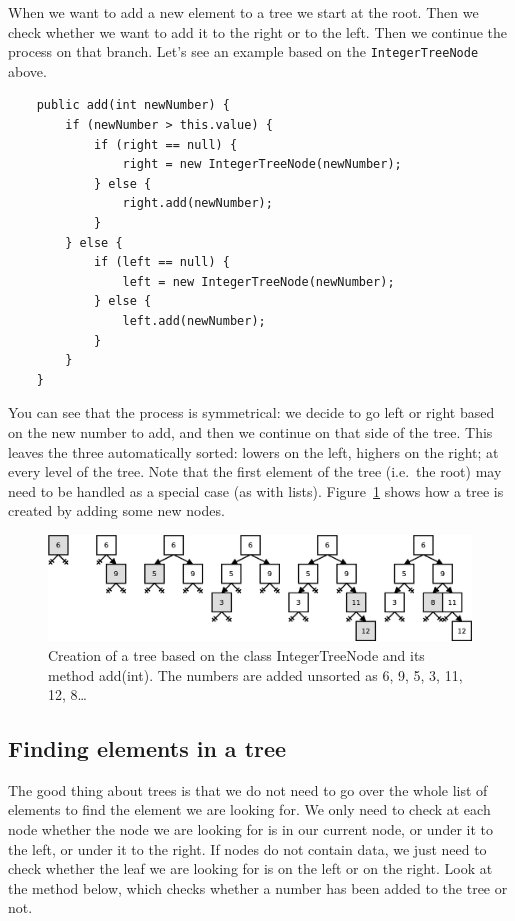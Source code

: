 When we want to add a new element to a tree we start at the root. Then
we check whether we want to add it to the right or to the left. Then
we continue the process on that branch. Let's see an example based on 
the \verb+IntegerTreeNode+ above.

\begin{verbatim}
    public add(int newNumber) {
        if (newNumber > this.value) {
            if (right == null) {
                right = new IntegerTreeNode(newNumber);
            } else {
                right.add(newNumber);
            }
        } else {
            if (left == null) {
                left = new IntegerTreeNode(newNumber);
            } else {
                left.add(newNumber);
            }
        }            
    }
\end{verbatim}

You can see that the process is symmetrical: we decide to go left or
right based on the new number to add, and then we continue on that
side of the tree. This leaves the three automatically sorted: lowers
on the left, highers on the right; at every level of the tree. 
Note that the first element of the tree (i.e.~the
root) may need to be handled as a special case (as with
lists). Figure~\ref{fig:treecr} shows how a tree is created by adding
some new nodes. 

\begin{figure}[hbtp]
  \centering
  \includegraphics[width=\textwidth]{gfx/tree-creation}
  \caption{Creation of a tree based on the class IntegerTreeNode and
    its method add(int). The numbers are added unsorted as 6, 9, 5, 3,
    11, 12, 8\ldots} 
  \label{fig:treecr}
\end{figure}

\subsection{Finding elements in a tree}
\label{sec:find-elem-tree}

The good thing about trees is that we do not need to go over the whole
list of elements to find the element we are looking for. We only need
to check at each node whether the node we are looking for is in our
current node, or under it to the left, or under it to the right. If
nodes do not contain data, we just need to check whether the leaf we
are looking for is on the left or on the right. Look at the method
below, which checks whether a number has been added to the tree or
not. 

